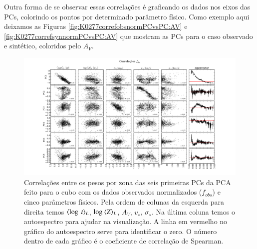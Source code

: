 Outra forma de se observar essas correlações é graficando os dados nos eixos das PCs, colorindo os pontos por
determinado parâmetro físico. Como exemplo aqui deixamos as Figuras \ref{fig:K0277correfobsnormPCvsPC:AV} e
\ref{fig:K0277correfsynnormPCvsPC:AV} que mostram as PCs para o caso observado e sintético, coloridos pelo $A_V$.

\begin{figure}
    \includegraphics[width=1.2\textwidth,angle=-90]{figuras/K0277-correl-f_obs_norm-PCvsPhys.pdf}
	\caption[Correlações PCs vs. par\^ametros f\'isicos - $f_{obs}$.]
    {Correlações entre os pesos por zona das seis primeiras PCs da PCA feito para o cubo com os dados observados
    normalizados ($f_{obs}$) e cinco parâmetros físicos. Pela ordem de colunas da esquerda para direita temos
    $\meanL{\log\ t}$, $\log\ \meanL{Z}$, $A_V$, $v_{\star}$, $\sigma_{\star}$. Na última coluna temos o autoespectro para ajudar na
    visualização. A linha em vermelho no gráfico do autoespectro serve para identificar o zero. O número dentro de
    cada gráfico é o coeficiente de correlação de Spearman.}
    \label{fig:K0277correfobsnorm}
\end{figure}

